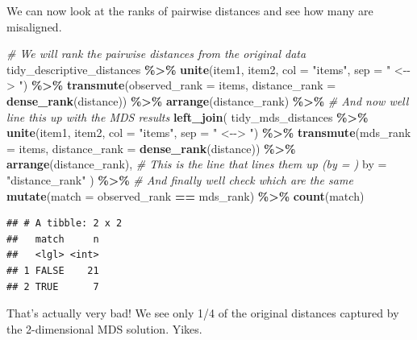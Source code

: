 \documentclass[
]{book}
\newenvironment{Shaded}{\begin{snugshade}}{\end{snugshade}}
\newcommand{\AttributeTok}[1]{\textcolor[rgb]{0.13,0.29,0.53}{#1}}
\newcommand{\CommentTok}[1]{\textcolor[rgb]{0.56,0.35,0.01}{\textit{#1}}}
\newcommand{\FunctionTok}[1]{\textcolor[rgb]{0.13,0.29,0.53}{\textbf{#1}}}
\newcommand{\NormalTok}[1]{#1}
\newcommand{\SpecialCharTok}[1]{\textcolor[rgb]{0.81,0.36,0.00}{\textbf{#1}}}
\newcommand{\StringTok}[1]{\textcolor[rgb]{0.31,0.60,0.02}{#1}}
\begin{document}
We can now look at the ranks of pairwise distances and see how many are misaligned.

\begin{Shaded}
\begin{Highlighting}[]
\CommentTok{\# We will rank the pairwise distances from the original data}
\NormalTok{tidy\_descriptive\_distances }\SpecialCharTok{\%\textgreater{}\%}
  \FunctionTok{unite}\NormalTok{(item1, item2, }\AttributeTok{col =} \StringTok{"items"}\NormalTok{, }\AttributeTok{sep =} \StringTok{" \textless{}{-}{-}\textgreater{} "}\NormalTok{) }\SpecialCharTok{\%\textgreater{}\%}
  \FunctionTok{transmute}\NormalTok{(}\AttributeTok{observed\_rank =}\NormalTok{ items,}
            \AttributeTok{distance\_rank =} \FunctionTok{dense\_rank}\NormalTok{(distance)) }\SpecialCharTok{\%\textgreater{}\%}
  \FunctionTok{arrange}\NormalTok{(distance\_rank) }\SpecialCharTok{\%\textgreater{}\%}
  \CommentTok{\# And now we\textquotesingle{}ll line this up with the MDS results}
  \FunctionTok{left\_join}\NormalTok{(}
\NormalTok{    tidy\_mds\_distances }\SpecialCharTok{\%\textgreater{}\%}
      \FunctionTok{unite}\NormalTok{(item1, item2, }\AttributeTok{col =} \StringTok{"items"}\NormalTok{, }\AttributeTok{sep =} \StringTok{" \textless{}{-}{-}\textgreater{} "}\NormalTok{) }\SpecialCharTok{\%\textgreater{}\%}
      \FunctionTok{transmute}\NormalTok{(}\AttributeTok{mds\_rank =}\NormalTok{ items,}
                \AttributeTok{distance\_rank =} \FunctionTok{dense\_rank}\NormalTok{(distance)) }\SpecialCharTok{\%\textgreater{}\%}
      \FunctionTok{arrange}\NormalTok{(distance\_rank),}
    \CommentTok{\# This is the line that lines them up (\textasciigrave{}by = \textasciigrave{})}
    \AttributeTok{by =} \StringTok{"distance\_rank"}
\NormalTok{  ) }\SpecialCharTok{\%\textgreater{}\%}
  \CommentTok{\# And finally we\textquotesingle{}ll check which are the same}
  \FunctionTok{mutate}\NormalTok{(}\AttributeTok{match =}\NormalTok{ observed\_rank }\SpecialCharTok{==}\NormalTok{ mds\_rank) }\SpecialCharTok{\%\textgreater{}\%}
  \FunctionTok{count}\NormalTok{(match)}
\end{Highlighting}
\end{Shaded}

\begin{verbatim}
## # A tibble: 2 x 2
##   match     n
##   <lgl> <int>
## 1 FALSE    21
## 2 TRUE      7
\end{verbatim}

That's actually very bad! We see only 1/4 of the original distances captured by the 2-dimensional MDS solution. Yikes.
\end{document}

